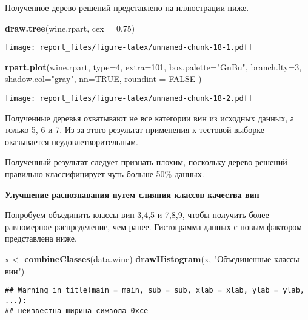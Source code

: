 \documentclass[
]{article}
\newenvironment{Shaded}{\begin{snugshade}}{\end{snugshade}}
\newcommand{\DataTypeTok}[1]{\textcolor[rgb]{0.13,0.29,0.53}{#1}}
\newcommand{\DecValTok}[1]{\textcolor[rgb]{0.00,0.00,0.81}{#1}}
\newcommand{\FloatTok}[1]{\textcolor[rgb]{0.00,0.00,0.81}{#1}}
\newcommand{\KeywordTok}[1]{\textcolor[rgb]{0.13,0.29,0.53}{\textbf{#1}}}
\newcommand{\NormalTok}[1]{#1}
\newcommand{\OtherTok}[1]{\textcolor[rgb]{0.56,0.35,0.01}{#1}}
\newcommand{\StringTok}[1]{\textcolor[rgb]{0.31,0.60,0.02}{#1}}
\begin{document}
Полученное дерево решений представлено на иллюстрации ниже.

\begin{Shaded}
\begin{Highlighting}[]
\KeywordTok{draw.tree}\NormalTok{(wine.rpart, }\DataTypeTok{cex =} \FloatTok{0.75}\NormalTok{)}
\end{Highlighting}
\end{Shaded}

\texttt{[image: report\_files/figure-latex/unnamed-chunk-18-1.pdf]}

\begin{Shaded}
\begin{Highlighting}[]
\KeywordTok{rpart.plot}\NormalTok{(wine.rpart, }
           \DataTypeTok{type=}\DecValTok{4}\NormalTok{,}
           \DataTypeTok{extra=}\DecValTok{101}\NormalTok{, }
           \DataTypeTok{box.palette=}\StringTok{"GnBu"}\NormalTok{,}
           \DataTypeTok{branch.lty=}\DecValTok{3}\NormalTok{, }
           \DataTypeTok{shadow.col=}\StringTok{"gray"}\NormalTok{, }
           \DataTypeTok{nn=}\OtherTok{TRUE}\NormalTok{,}
           \DataTypeTok{roundint =} \OtherTok{FALSE}
\NormalTok{)}
\end{Highlighting}
\end{Shaded}

\texttt{[image: report\_files/figure-latex/unnamed-chunk-18-2.pdf]}

Полученные деревья охватывают не все категории вин из исходных данных, а
только 5, 6 и 7. Из-за этого результат применения к тестовой выборке
оказывается неудовлетворительным.

Полученный результат следует признать плохим, поскольку дерево решений
правильно классифицирует чуть больше 50\% данных.

\textbf{Улучшение распознавания путем слияния классов качества вин}

Попробуем объединить классы вин 3,4,5 и 7,8,9, чтобы получить более
равномерное распределение, чем ранее. Гистограмма данных с новым
фактором представлена ниже.

\begin{Shaded}
\begin{Highlighting}[]
\NormalTok{x <-}\StringTok{ }\KeywordTok{combineClasses}\NormalTok{(data.wine)}
\KeywordTok{drawHistogram}\NormalTok{(x, }\StringTok{"Объединенные классы вин"}\NormalTok{)}
\end{Highlighting}
\end{Shaded}

\begin{verbatim}
## Warning in title(main = main, sub = sub, xlab = xlab, ylab = ylab, ...):
## неизвестна ширина символа 0xce
\end{verbatim}
\end{document}
